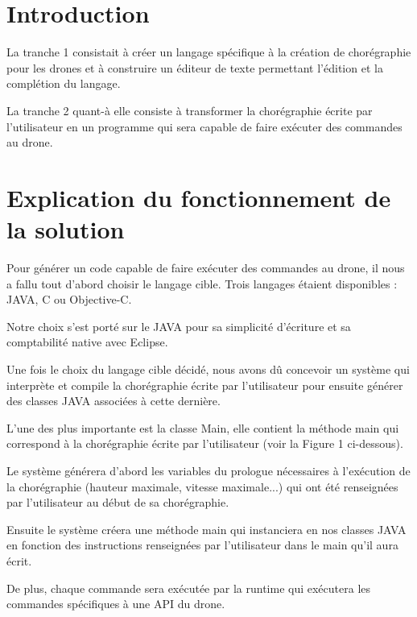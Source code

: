 \documentclass[12pt]{article}
\begin{document}
    \section{Introduction}
        La tranche 1 consistait à créer un langage spécifique à la création de chorégraphie pour les drones et à construire un éditeur de texte permettant l'édition et la complétion du langage.
        
        La tranche 2 quant-à elle consiste à transformer la chorégraphie écrite par l'utilisateur en un programme qui sera capable de faire exécuter des commandes au drone.
    
    \section{Explication du fonctionnement de la solution}
        Pour générer un code capable de faire exécuter des commandes au drone, il nous a fallu tout d'abord choisir le langage cible. Trois langages étaient disponibles : JAVA, C ou Objective-C.
        
        Notre choix s'est porté sur le JAVA pour sa simplicité d'écriture et sa comptabilité native avec Eclipse.
        
        Une fois le choix du langage cible décidé, nous avons dû concevoir un système qui interprète et compile la chorégraphie écrite par l'utilisateur pour ensuite générer des classes JAVA associées à cette dernière.
        
        L'une des plus importante est la classe Main, elle contient la méthode main qui correspond à la chorégraphie écrite par l'utilisateur (voir la Figure 1 ci-dessous).
        
        Le système générera d'abord les variables du prologue nécessaires à l'exécution de la chorégraphie (hauteur maximale, vitesse maximale...) qui ont été renseignées par l'utilisateur au début de sa chorégraphie.
        
        Ensuite le système créera une méthode main qui instanciera en nos classes JAVA en fonction des instructions renseignées par l'utilisateur dans le main qu'il aura écrit.
        
        De plus, chaque commande sera exécutée par la runtime qui exécutera les commandes spécifiques à une API du drone.
        
\end{document}

